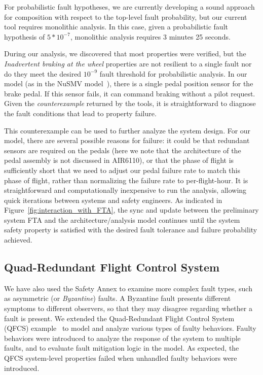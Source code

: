 For probabilistic fault hypotheses, we are currently developing a sound approach for composition with respect to the top-level fault probability, but our current tool requires monolithic analysis.  In this case, given a probabilistic fault hypothesis of $5*10^{-7}$, monolithic analysis requires 3 minutes 25 seconds.

During our analysis, we discovered that most properties were verified, but the \textit{Inadvertent braking at the wheel} properties are not resilient to a single fault nor do they meet the desired $10^{-9}$ fault threshold for probabilistic analysis.  In our model (as in the NuSMV model~\cite{DBLP:conf/cav/BozzanoCPJKPRT15}), there is a single pedal position sensor for the brake pedal.  If this sensor fails, it can command braking without a pilot request.  Given the {\em counterexample} returned by the tools, it is straightforward to diagnose the fault conditions that lead to property failure.

This counterexample can be used to further analyze the system design.  For our model, there are several possible reasons for failure: it could be that redundant sensors are required on the pedals (here we note that the architecture of the pedal assembly is not discussed in AIR6110), or that the phase of flight is sufficiently short that we need to adjust our pedal failure rate to match this phase of flight, rather than normalizing the failure rate to per-flight-hour.  It is straightforward and computationally inexpensive to run the analysis, allowing quick iterations between systems and safety engineers. As indicated in Figure~\ref{fig:interaction_with_FTA}, the sync and update between the preliminary system FTA and the architecture/analysis model continues until the system safety property is satisfied with the desired fault tolerance and failure probability achieved.




\subsection{Quad-Redundant Flight Control System}
We have also used the Safety Annex to examine more complex fault types, such as asymmetric (or {\em Byzantine}) faults.  A Byzantine fault presents different symptoms to different observers, so that they may disagree regarding whether a fault is present.
We extended the Quad-Redundant Flight Control System (QFCS) example~\cite{QFCS15:backes} to model and analyze various types of faulty behaviors. Faulty behaviors were introduced to analyze the response of the system to multiple faults, and to evaluate fault mitigation logic in the model. As expected, the QFCS system-level properties failed when unhandled faulty behaviors were introduced.

